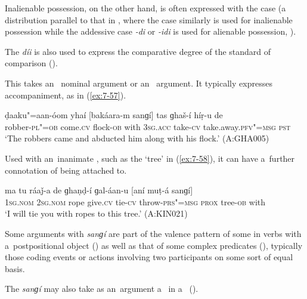 Inalienable possession, on the other hand, is often expressed with the  case (a distribution parallel to that in  , where the  case similarly is used for inalienable possession while the addessive case \textit{-di} or \textit{-idi} is used for alienable possession, \citealt[65, 69--70]{schmidtkohistani2008}).



The  \textit{díi} is also used to express the comparative degree of the standard of comparison ().



 This  takes an~ nominal argument or an~  argument. It typically expresses accompaniment, as in (\ref{ex:7-57}).

\begin{exe}
\ex
\label{ex:7-57}
\gll ḍaaku"=aan-óom yhaí [bakáara-m sanɡí] tas ɡhaš-í híṛ-u de \\
robber-\textsc{pl"=ob} come.\textsc{cv} flock-\textsc{ob}  with \textsc{3sg.acc} take-\textsc{cv} take.away.\textsc{pfv"=msg} \textsc{pst} \\
\glt `The robbers came and abducted him along with his flock.' (A:GHA005)
\end{exe}

Used with an~inanimate , such as the `tree' in (\ref{ex:7-58}), it can have a~further connotation of being attached to.

\begin{exe}
\ex
\label{ex:7-58}
\gll ma tu ráaǰ-a de ɡhaṇḍ-í ɡal-áan-u [aní muṭ-á sanɡí] \\
\textsc{1sg.nom} \textsc{2sg.nom} rope give.\textsc{cv} tie-\textsc{cv} throw-\textsc{prs"=msg} \textsc{prox} tree-\textsc{ob} with \\
\glt `I will tie you with ropes to this tree.' (A:KIN021)
\end{exe}

Some arguments with \textit{sanɡí} are part of the valence pattern of some in verbs with a~postpositional object () as well as that of some complex predicates (), typically those coding events or actions involving two participants on some sort of equal basis.


The  \textit{sanɡí} may also take as an~argument a~ in a~  ().


